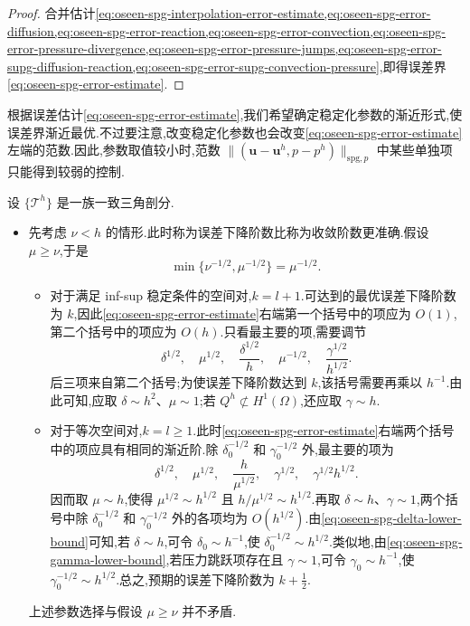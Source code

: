 \begin{proof}
合并估计\cref{eq:oseen-spg-interpolation-error-estimate,eq:oseen-spg-error-diffusion,eq:oseen-spg-error-reaction,eq:oseen-spg-error-convection,eq:oseen-spg-error-pressure-divergence,eq:oseen-spg-error-pressure-jumps,eq:oseen-spg-error-supg-diffusion-reaction,eq:oseen-spg-error-supg-convection-pressure},即得误差界\cref{eq:oseen-spg-error-estimate}.
\end{proof}

\begin{note}[稳定化参数的最优渐近性]\label{note:oseen-optimal-stabilization}
根据误差估计\cref{eq:oseen-spg-error-estimate},我们希望确定稳定化参数的渐近形式,使误差界渐近最优.不过要注意,改变稳定化参数也会改变\cref{eq:oseen-spg-error-estimate}左端的范数.因此,参数取值较小时,范数 $\|(\bm{u}-\bm{u}^h,p-p^h)\|_{\mathrm{spg},p}$ 中某些单独项只能得到较弱的控制.

设 $\{\mathcal{T}^h\}$ 是一族一致三角剖分.
\begin{itemize}
  \item 先考虑 $\nu<h$ 的情形.此时称为误差下降阶数比称为收敛阶数更准确.假设 $\mu\ge\nu$,于是
  \[
    \min\{\nu^{-1/2},\mu^{-1/2}\}=\mu^{-1/2}.
  \]
  \begin{itemize}
    \item 对于满足 inf-sup 稳定条件的空间对,$k=l+1$.可达到的最优误差下降阶数为 $k$,因此\cref{eq:oseen-spg-error-estimate}右端第一个括号中的项应为 $O(1)$,第二个括号中的项应为 $O(h)$.只看最主要的项,需要调节
    \[
      \delta^{1/2},\quad \mu^{1/2},\quad
      \frac{\delta^{1/2}}{h},\quad
      \mu^{-1/2},\quad
      \frac{\gamma^{1/2}}{h^{1/2}}.
    \]
    后三项来自第二个括号;为使误差下降阶数达到 $k$,该括号需要再乘以 $h^{-1}$.由此可知,应取 $\delta\sim h^2$、$\mu\sim1$;若 $Q^h\not\subset H^1(\Omega)$,还应取 $\gamma\sim h$.

    \item 对于等次空间对,$k=l\ge1$.此时\cref{eq:oseen-spg-error-estimate}右端两个括号中的项应具有相同的渐近阶.除 $\delta_0^{-1/2}$ 和 $\gamma_0^{-1/2}$ 外,最主要的项为
    \[
      \delta^{1/2},\quad \mu^{1/2},\quad
      \frac{h}{\mu^{1/2}},\quad
      \gamma^{1/2},\quad
      \gamma^{1/2}h^{1/2}.
    \]
    因而取 $\mu\sim h$,使得 $\mu^{1/2}\sim h^{1/2}$ 且 $h/\mu^{1/2}\sim h^{1/2}$.再取 $\delta\sim h$、$\gamma\sim1$,两个括号中除 $\delta_0^{-1/2}$ 和 $\gamma_0^{-1/2}$ 外的各项均为 $O(h^{1/2})$.由\cref{eq:oseen-spg-delta-lower-bound}可知,若 $\delta\sim h$,可令 $\delta_0\sim h^{-1}$,使 $\delta_0^{-1/2}\sim h^{1/2}$.类似地,由\cref{eq:oseen-spg-gamma-lower-bound},若压力跳跃项存在且 $\gamma\sim1$,可令 $\gamma_0\sim h^{-1}$,使 $\gamma_0^{-1/2}\sim h^{1/2}$.总之,预期的误差下降阶数为 $k+\tfrac12$.
  \end{itemize}
  上述参数选择与假设 $\mu\ge\nu$ 并不矛盾.


\end{itemize}
\end{note}
